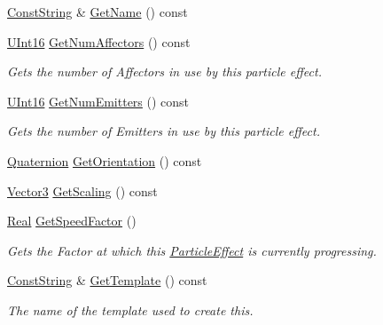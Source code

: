 \begin{DoxyCompactItemize}
\item 
\hyperlink{namespaceMezzanine_a63cd699ac54b73953f35ec9cfc05e506}{ConstString} \& \hyperlink{classMezzanine_1_1ParticleEffect_a43176eb1ad80019bc2a839e597141dd7}{GetName} () const 
\item 
\hyperlink{namespaceMezzanine_a1b6c09063432c7ddd87011c88306c767}{UInt16} \hyperlink{classMezzanine_1_1ParticleEffect_aac2469d149a5509d0f9f1486b4ca036f}{GetNumAffectors} () const 
\begin{DoxyCompactList}\small\item\em Gets the number of Affectors in use by this particle effect. \item\end{DoxyCompactList}\item 
\hyperlink{namespaceMezzanine_a1b6c09063432c7ddd87011c88306c767}{UInt16} \hyperlink{classMezzanine_1_1ParticleEffect_a7c3d466cfef8a41a63b03d3935e64f1b}{GetNumEmitters} () const 
\begin{DoxyCompactList}\small\item\em Gets the number of Emitters in use by this particle effect. \item\end{DoxyCompactList}\item 
\hyperlink{classMezzanine_1_1Quaternion}{Quaternion} \hyperlink{classMezzanine_1_1ParticleEffect_ac47f0c537dd4b789c502bb2a3af61a56}{GetOrientation} () const 
\item 
\hyperlink{classMezzanine_1_1Vector3}{Vector3} \hyperlink{classMezzanine_1_1ParticleEffect_ad593e62458141a8e5a684fad55342caf}{GetScaling} () const 
\item 
\hyperlink{namespaceMezzanine_a726731b1a7df72bf3583e4a97282c6f6}{Real} \hyperlink{classMezzanine_1_1ParticleEffect_a39aa306cd45a3bff0e4ee1442fbe19d9}{GetSpeedFactor} ()
\begin{DoxyCompactList}\small\item\em Gets the Factor at which this \hyperlink{classMezzanine_1_1ParticleEffect}{ParticleEffect} is currently progressing. \item\end{DoxyCompactList}\item 
\hyperlink{namespaceMezzanine_a63cd699ac54b73953f35ec9cfc05e506}{ConstString} \& \hyperlink{classMezzanine_1_1ParticleEffect_ad39ed422ad277f93a6040ad27b8b4951}{GetTemplate} () const 
\begin{DoxyCompactList}\small\item\em The name of the template used to create this. \item\end{DoxyCompactList}\item 

\end{DoxyCompactItemize}
